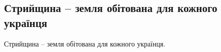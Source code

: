  
 
 
 
 
\subsection{Стрийщина – земля обітована для кожного українця}
\label{sec:16_05_2021.fb.nicoj_larisa.1.stryj_kiev_ukraina_mova}

Стрийщина – земля обітована для кожного українця. 


